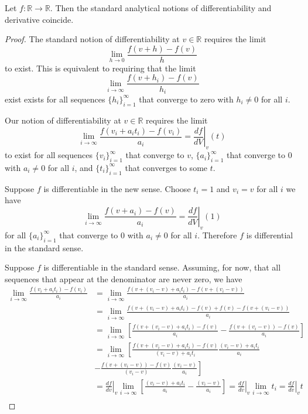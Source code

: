 \begin{prop}
	Let $f:\mathbb{R} \to \mathbb{R}$. Then the standard analytical notions of differentiability and derivative coincide.
\end{prop}
\begin{proof}
	The standard notion of differentiability at $v \in \mathbb{R}$ requires the limit
	$$ \lim\limits_{h \to 0} \frac{f(v + h) - f(v)}{h} $$
	to exist. This is equivalent to requiring that the limit
	$$ \lim\limits_{i \to \infty} \frac{f(v + h_i) - f(v)}{h_i} $$
	exist exists for all sequences $\{h_i\}_{i=1}^{\infty}$ that converge to zero with $h_i \neq 0$ for all $i$.
	
	Our notion of differentiability at $v \in \mathbb{R}$ requires the limit
	$$ \lim\limits_{i \to \infty} \frac{f(v_i + a_i t_i) - f(v_i)}{a_i} = \left.\frac{df}{dV} \right|_{v} (t)$$
	to exist for all sequences $\{v_i\}_{i=1}^{\infty}$ that converge to $v$, $\{a_i\}_{i=1}^{\infty}$ that converge to $0$ with $a_i \neq 0$ for all $i$, and $\{t_i\}_{i=1}^{\infty}$ that converges to some $t$.
	
	Suppose $f$ is differentiable in the new sense. Choose $t_i = 1$ and $v_i = v$ for all $i$ we have
	$$ \lim\limits_{i \to \infty} \frac{f(v + a_i) - f(v)}{a_i} = \left.\frac{df}{dV} \right|_{v} (1)$$
	for all $\{a_i\}_{i=1}^{\infty}$ that converge to $0$ with $a_i \neq 0$ for all $i$. Therefore $f$ is differential in the standard sense.
	
	Suppose $f$ is differentiable in the standard sense. Assuming, for now, that all sequences that appear at the denominator are never zero, we have
	\begin{align*}
	\lim\limits_{i \to \infty} \frac{f(v_i + a_i t_i) - f(v_i)}{a_i} &= \lim\limits_{i \to \infty} \frac{f(v + (v_i - v) + a_i t_i) - f(v + (v_i - v))}{a_i} \\
	&= \lim\limits_{i \to \infty} \frac{f(v + (v_i - v) + a_i t_i) - f(v) + f(v) - f(v + (v_i - v))}{a_i} \\
	&= \lim\limits_{i \to \infty} \left[\frac{f(v + (v_i - v) + a_i t_i) - f(v)}{a_i}
	- \frac{f(v + (v_i - v)) - f(v)}{a_i} \right]\\
	&= \lim\limits_{i \to \infty} \left[ \frac{f(v + (v_i - v) + a_i t_i) - f(v)}{(v_i - v) + a_i t_i} \frac{(v_i - v) + a_i t_i}{a_i} \right. \\
	&- \left.\frac{f(v + (v_i - v)) - f(v)}{(v_i - v)}  \frac{(v_i - v)}{a_i} \right] \\
	&=  \left.\frac{df}{dv} \right|_{v} \lim\limits_{i \to \infty} \left[ \frac{(v_i - v) + a_i t_i}{a_i} -  \frac{(v_i - v)}{a_i}\right] = \left.\frac{df}{dv} \right|_{v} \lim\limits_{i \to \infty} t_i = \left.\frac{df}{dv} \right|_{v} t \\
	\end{align*}
\end{proof}

